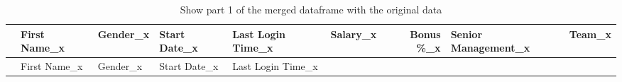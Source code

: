 \documentclass [oneside,10pt,a4paper,ngerman,BCOR10mm,headsepline,parindent,final]{scrartcl}
\begin{document}
    \begin{longtable}[]{@{}rllllrrll@{}}
\caption{Show part 1 of the merged dataframe with the original
data}\tabularnewline
\toprule
\begin{minipage}[b]{0.03\columnwidth}\raggedleft
\strut
\end{minipage} & \begin{minipage}[b]{0.09\columnwidth}\raggedright
First Name\_x\strut
\end{minipage} & \begin{minipage}[b]{0.06\columnwidth}\raggedright
Gender\_x\strut
\end{minipage} & \begin{minipage}[b]{0.09\columnwidth}\raggedright
Start Date\_x\strut
\end{minipage} & \begin{minipage}[b]{0.11\columnwidth}\raggedright
Last Login Time\_x\strut
\end{minipage} & \begin{minipage}[b]{0.06\columnwidth}\raggedleft
Salary\_x\strut
\end{minipage} & \begin{minipage}[b]{0.07\columnwidth}\raggedleft
Bonus \%\_x\strut
\end{minipage} & \begin{minipage}[b]{0.12\columnwidth}\raggedright
Senior Management\_x\strut
\end{minipage} & \begin{minipage}[b]{0.12\columnwidth}\raggedright
Team\_x\strut
\end{minipage}\tabularnewline
\midrule
\endfirsthead
\toprule
\begin{minipage}[b]{0.03\columnwidth}\raggedleft
\strut
\end{minipage} & \begin{minipage}[b]{0.09\columnwidth}\raggedright
First Name\_x\strut
\end{minipage} & \begin{minipage}[b]{0.06\columnwidth}\raggedright
Gender\_x\strut
\end{minipage} & \begin{minipage}[b]{0.09\columnwidth}\raggedright
Start Date\_x\strut
\end{minipage} & \begin{minipage}[b]{0.11\columnwidth}\raggedright
Last Login Time\_x\strut
\end{minipage} & \begin{minipage}[b]{0.06\columnwidth}\raggedleft

\end{minipage}
\end{longtable}
\end{document}
